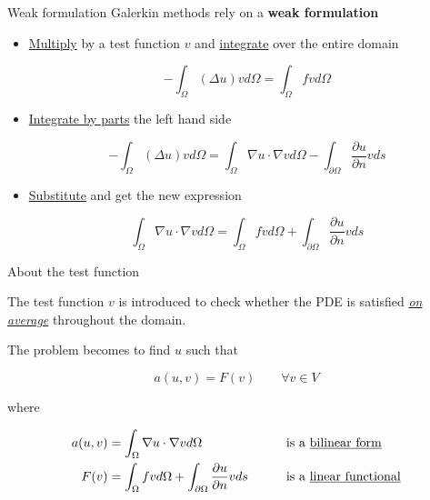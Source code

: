 \begin{frame}{Weak formulation}
   Galerkin methods rely on a \textbf{\textcolor{BrickRed}{weak formulation}}

   \vspace{0.5cm}

   \pause

   \begin{itemize}
      \item \underline{Multiply} by a \textcolor{BrickRed}{test function} $v$ and \underline{integrate} over the entire domain
      
      \begin{equation*}
         -\int_\Omega(\Delta u)vd\Omega=\int_\Omega fvd\Omega
      \end{equation*}

      \pause

      \item \underline{Integrate by parts} the left hand side
      
      \begin{equation*}
         -\int_\Omega(\Delta u)vd\Omega=\int_\Omega\nabla u\cdot\nabla vd\Omega-\int_{\partial\Omega}\frac{\partial u}{\partial n}vds
      \end{equation*}

      \pause

      \item \underline{Substitute} and get the new expression
      
      \begin{equation*}
         \int_\Omega\nabla u\cdot\nabla vd\Omega=\int_\Omega fvd\Omega+\int_{\partial\Omega}\frac{\partial u}{\partial n}vds
      \end{equation*}
   \end{itemize}
\end{frame}

\begin{frame}{About the test function}
   \begin{center}
      \begin{framed}
         The test function $v$ is introduced to check whether the PDE is satisfied \textit{\underline{on average}} throughout the domain.
      \end{framed}
   \end{center}

   \pause

   The problem becomes to find $u$ such that

   \begin{equation*}
      a(u,v)=F(v) \qquad \forall v\in V
   \end{equation*}

   where

   \begin{alignat*}{2}
      a(u,v)&=\int_\Omega\nabla u\cdot\nabla vd\Omega \qquad &&\text{is a \underline{bilinear form}}\\
      F(v)&=\int_\Omega fvd\Omega+\int_{\partial\Omega}\frac{\partial u}{\partial n}vds \qquad &&\text{is a \underline{linear functional}}
   \end{alignat*}
\end{frame}

